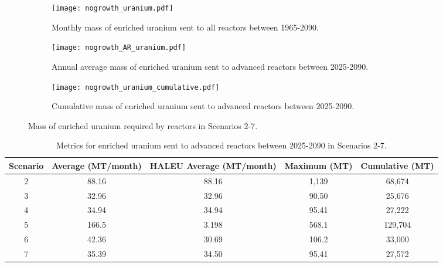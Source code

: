 \begin{figure}[h!]
    \centering
    \begin{subfigure}[b]{0.45\textwidth}
        \centering
        \texttt{[image: nogrowth\_uranium.pdf]}
        \caption{Monthly mass of enriched uranium sent to all reactors 
        between 1965-2090.}
        \label{fig:nogrowth_all_uranium}
    \end{subfigure}
    \hfill
    \begin{subfigure}[b]{0.45\textwidth}
        \centering
        \texttt{[image: nogrowth\_AR\_uranium.pdf]}
        \caption{Annual average mass of enriched uranium sent to 
        advanced reactors between 2025-2090.}
        \label{fig:nogrowth_AR_uranium}
    \end{subfigure}
    \begin{subfigure}[b]{0.45\textwidth}
        \centering
        \texttt{[image: nogrowth\_uranium\_cumulative.pdf]}
        \caption{Cumulative mass of enriched 
        uranium sent to advanced reactors between 2025-2090.}
        \label{fig:nogrowth_uranium_cumulative}
    \end{subfigure}
       \caption{Mass of enriched uranium required by reactors
        in Scenarios 2-7.}
       \label{fig:nogrowth_uranium}
\end{figure}

\begin{table}[h!]
    \centering 
    \caption{Metrics for enriched uranium sent to advanced 
    reactors between 2025-2090 in Scenarios 2-7.}
    \label{tab:nogrowth_uranium}
    \begin{tabular}{c c c c c}
        \hline
        Scenario & Average (MT/month) & \gls{HALEU} Average 
        (MT/month) & Maximum (MT)& Cumulative (MT)\\\hline
        2 & 88.16 & 88.16 & 1,139 & 68,674\\
        3 & 32.96 & 32.96 & 90.50 & 25,676\\
        4 & 34.94 & 34.94 & 95.41 & 27,222\\
        5 & 166.5 & 3.198 & 568.1 & 129,704\\
        6 & 42.36 & 30.69 & 106.2 & 33,000\\
        7 & 35.39 & 34.50 & 95.41 & 27,572\\
        \hline
    \end{tabular}
\end{table}

